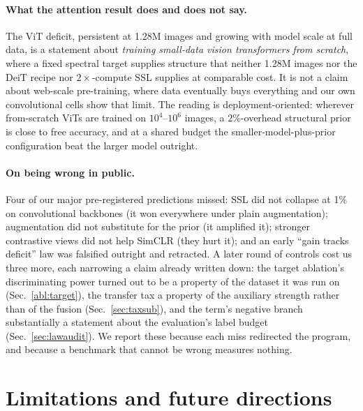 \paragraph{What the attention result does and does not say.} The ViT deficit,
persistent at 1.28M images and growing with model scale at full data, is a
statement about \emph{training small-data vision transformers from scratch},
where a fixed spectral target supplies structure that neither 1.28M images nor
the DeiT recipe nor $2\times$-compute SSL supplies at comparable cost. It is
not a claim about web-scale pre-training, where data eventually buys everything
and our own convolutional cells show that limit. The reading is
deployment-oriented: wherever from-scratch ViTs are trained on $10^4$--$10^6$
images, a $2\%$-overhead structural prior is close to free accuracy, and at a
shared budget the smaller-model-plus-prior configuration beat the larger model
outright.

\paragraph{On being wrong in public.} Four of our major pre-registered
predictions missed: SSL did not collapse at 1\% on convolutional backbones (it
won everywhere under plain augmentation); augmentation did not substitute for
the prior (it amplified it); stronger contrastive views did not help SimCLR
(they hurt it); and an early ``gain tracks deficit'' law was falsified outright
and retracted. A later round of controls cost us three more, each narrowing a claim
already written down: the target ablation's
discriminating power turned out to be a property of the dataset it was run on
(Sec.~\ref{abl:target}), the transfer tax a property of the auxiliary
strength rather than of the fusion (Sec.~\ref{sec:taxsub}), and the \readout{}
term's negative branch substantially a statement about the evaluation's label
budget (Sec.~\ref{sec:lawaudit}). We report these because each miss
redirected the program, and because a benchmark that cannot be wrong measures
nothing.

\section{Limitations and future directions}\label{sec:limits}

